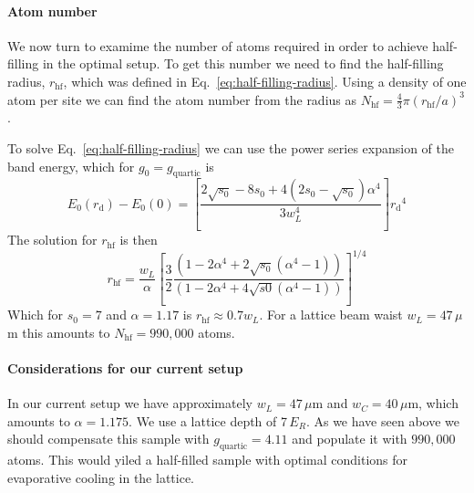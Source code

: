 \documentclass[11pt,letter]{article}
\newcommand{\rdiag}{\ensuremath{ r_{\text{d}} } }
\begin{document}
\paragraph{Atom number} We now turn to examime the number of atoms required
in order to achieve half-filling in the optimal setup.   To get this number
we need to find the half-filling radius, $r_{\text{hf}}$,  which was defined
in Eq.~\ref{eq:half-filling-radius}.  Using a density of one atom per site we
can find the atom number from the radius as $N_{\text{hf}} = \frac{4}{3} \pi
(r_{\text{hf}}/a)^{3}$. 

To solve Eq.~\ref{eq:half-filling-radius}  we can use the power series
expansion of the band energy, which for $g_{0}=g_{\text{quartic}}$ is 
\begin{equation}
  E_{0}(\rdiag) - E_{0}(0) = \left[  
  \frac{  2\sqrt{s_{0}} - 8s_{0} + 4( 2s_{0} -\sqrt{s_{0}} ) \alpha^{4} }
  { 3 w_{L}^{4} } \right] \rdiag^{4} 
\end{equation}
The solution for $r_{\text{hf}}$ is then 
\begin{equation}
  r_{\text{hf}} =  \frac{w_{L}}{\alpha} \left[ 
  \frac{3}{2}  \frac{( 1 - 2\alpha^{4} + 2 \sqrt{s_{0}}( \alpha^{4} -1 ) )}
  { ( 1 -  2\alpha^{4} + 4 \sqrt{s0} ( \alpha^{4} -1 ) ) } \right]^{1/4} 
\end{equation}
Which for $s_{0}=7$ and $\alpha=1.17$ is  $r_{\text{hf}}\approx 0.7 w_{L}$.
For a lattice beam waist $w_{L}=47\,\mu$m  this amounts to
$N_{\text{hf}}=990,000$ atoms.  
 

% 

\paragraph{Considerations for our current setup}

In our current setup we have approximately $w_{L}=47\,\mu$m and
$w_{C}=40\,\mu$m,  which amounts to $\alpha=1.175$.   We use a lattice depth
of 7\,$E_{R}$.   As we have seen above we should compensate this sample with
$g_{\text{quartic}} = 4.11$ and populate it with $990,000$ atoms.  This would
yiled a half-filled sample with optimal conditions for evaporative cooling in
the lattice.   
\end{document}
